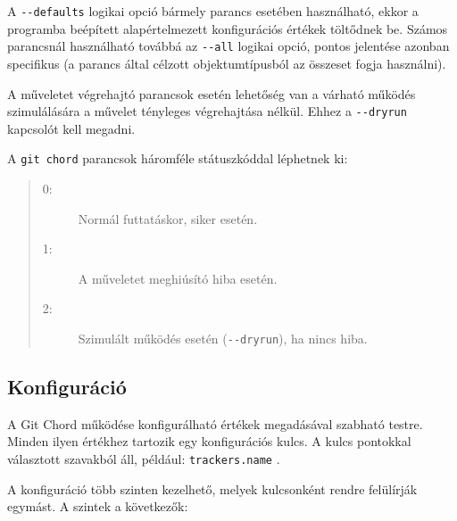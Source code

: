 \documentclass[
]{elteikthesis}[2025/03/25]
\begin{document}
A \verb|--defaults| logikai opció bármely parancs esetében használható,
ekkor a programba beépített alapértelmezett konfigurációs értékek töltődnek be.
Számos parancsnál használható továbbá az \verb|--all| logikai opció,
pontos jelentése azonban specifikus
(a parancs által célzott objektumtípusból az összeset fogja használni).

A műveletet végrehajtó parancsok esetén lehetőség van a várható működés szimulálására
a művelet tényleges végrehajtása nélkül.
Ehhez a \verb|--dryrun| kapcsolót kell megadni.

A \texttt{git chord} parancsok háromféle státuszkóddal léphetnek ki:

\begin{quote}
\begin{description}
    \item[0:] Normál futtatáskor, siker esetén.
    \item[1:] A műveletet meghiúsító hiba esetén.
    \item[2:] Szimulált működés esetén (\verb|--dryrun|), ha nincs hiba.
\end{description}
\end{quote}

\subsection{Konfiguráció}

A Git Chord működése konfigurálható értékek megadásával szabható testre.
Minden ilyen értékhez tartozik egy konfigurációs kulcs.
A kulcs pontokkal választott szavakból áll, például: \verb|trackers.name| .

A konfiguráció több szinten kezelhető, melyek kulcsonként rendre felülírják egymást.
A szintek a következők:
\end{document}
